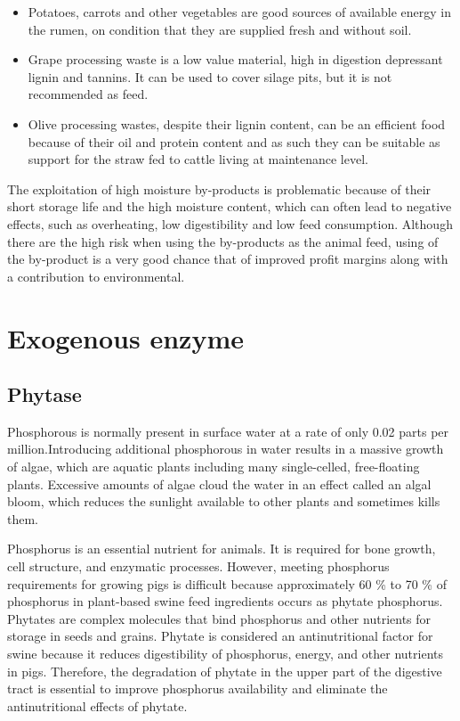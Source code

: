\documentclass[]{book}
\begin{document}
\begin{itemize}
\item
  Potatoes, carrots and other vegetables are good sources of available
  energy in the rumen, on condition that they are supplied fresh and
  without soil.
\item
  Grape processing waste is a low value material, high in digestion
  depressant lignin and tannins. It can be used to cover silage pits,
  but it is not recommended as feed.
\item
  Olive processing wastes, despite their lignin content, can be an
  efficient food because of their oil and protein content and as such
  they can be suitable as support for the straw fed to cattle living at
  maintenance level.
\end{itemize}

The exploitation of high moisture by-products is problematic because of
their short storage life and the high moisture content, which can often
lead to negative effects, such as overheating, low digestibility and low
feed consumption. Although there are the high risk when using the
by-products as the animal feed, using of the by-product is a very good
chance that of improved profit margins along with a contribution to
environmental.

\section{Exogenous enzyme}\label{exogenous-enzyme}

\subsection{Phytase}\label{phytase}

Phosphorous is normally present in surface water at a rate of only 0.02
parts per million.Introducing additional phosphorous in water results in
a massive growth of algae, which are aquatic plants including many
single-celled, free-floating plants. Excessive amounts of algae cloud
the water in an effect called an algal bloom, which reduces the sunlight
available to other plants and sometimes kills them.

Phosphorus is an essential nutrient for animals. It is required for bone
growth, cell structure, and enzymatic processes. However, meeting
phosphorus requirements for growing pigs is difficult because
approximately 60 \% to 70 \% of phosphorus in plant-based swine feed
ingredients occurs as phytate phosphorus. Phytates are complex molecules
that bind phosphorus and other nutrients for storage in seeds and
grains. Phytate is considered an antinutritional factor for swine
because it reduces digestibility of phosphorus, energy, and other
nutrients in pigs. Therefore, the degradation of phytate in the upper
part of the digestive tract is essential to improve phosphorus
availability and eliminate the antinutritional effects of phytate.
\end{document}
